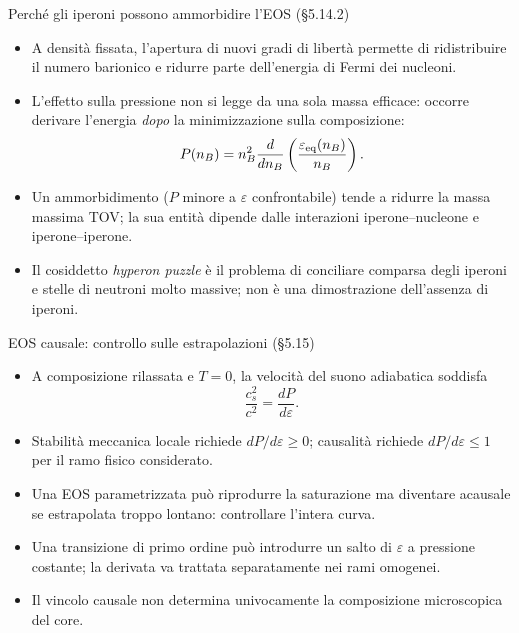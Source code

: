 \begin{frame}[t]{Perché gli iperoni possono ammorbidire l'EOS (§5.14.2)}
\small
\begin{itemize}
\item A densità fissata, l'apertura di nuovi gradi di libertà permette di ridistribuire il numero barionico e ridurre parte dell'energia di Fermi dei nucleoni.
\item L'effetto sulla pressione non si legge da una sola massa efficace: occorre derivare l'energia \emph{dopo} la minimizzazione sulla composizione:
\[
P(n_B)=n_B^2\frac{d}{dn_B}\left(\frac{\varepsilon_{\rm eq}(n_B)}{n_B}\right).
\]
\item Un ammorbidimento ($P$ minore a $\varepsilon$ confrontabile) tende a ridurre la massa massima TOV; la sua entità dipende dalle interazioni iperone--nucleone e iperone--iperone.
\item Il cosiddetto \emph{hyperon puzzle} è il problema di conciliare comparsa degli iperoni e stelle di neutroni molto massive; non è una dimostrazione dell'assenza di iperoni.
\end{itemize}
\end{frame}

\begin{frame}[t]{EOS causale: controllo sulle estrapolazioni (§5.15)}
\small
\begin{itemize}
\item A composizione rilassata e $T=0$, la velocità del suono adiabatica soddisfa
\[
\frac{c_s^2}{c^2}=\frac{dP}{d\varepsilon}.
\]
\item Stabilità meccanica locale richiede $dP/d\varepsilon\ge0$; causalità richiede $dP/d\varepsilon\le1$ per il ramo fisico considerato.
\item Una EOS parametrizzata può riprodurre la saturazione ma diventare acausale se estrapolata troppo lontano: controllare l'intera curva.
\item Una transizione di primo ordine può introdurre un salto di $\varepsilon$ a pressione costante; la derivata va trattata separatamente nei rami omogenei.
\item Il vincolo causale non determina univocamente la composizione microscopica del core.
\end{itemize}
\end{frame}


